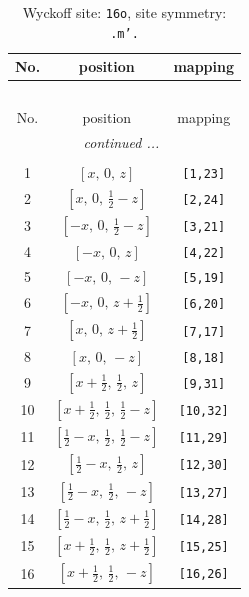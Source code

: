 \documentclass[fleqn,8pt]{jsarticle}
\begin{document}
\renewcommand{\arraystretch}{1.2}
\begin{longtable}{ccc}
\caption{Wyckoff site: {\tt 16o}, site symmetry: {\tt .m'.}}
 \\
 \hline \hline
No. & position & mapping \\ \hline \endfirsthead

\multicolumn{2}{l}{\tablename\ \thetable{}} \\
 \hline \hline
No. & position & mapping \\ \hline \endhead

 \hline \hline
\multicolumn{2}{r}{\footnotesize\it continued ...} \\ \endfoot

 \hline \hline
\multicolumn{2}{r}{} \\ \endlastfoot

1 & $\left[ x,\, 0,\, z \right]$ & {\tt [1,23]} \\ \hline
2 & $\left[ x,\, 0,\, \frac{1}{2} - z \right]$ & {\tt [2,24]} \\ \hline
3 & $\left[ - x,\, 0,\, \frac{1}{2} - z \right]$ & {\tt [3,21]} \\ \hline
4 & $\left[ - x,\, 0,\, z \right]$ & {\tt [4,22]} \\ \hline
5 & $\left[ - x,\, 0,\, - z \right]$ & {\tt [5,19]} \\ \hline
6 & $\left[ - x,\, 0,\, z + \frac{1}{2} \right]$ & {\tt [6,20]} \\ \hline
7 & $\left[ x,\, 0,\, z + \frac{1}{2} \right]$ & {\tt [7,17]} \\ \hline
8 & $\left[ x,\, 0,\, - z \right]$ & {\tt [8,18]} \\ \hline
9 & $\left[ x + \frac{1}{2},\, \frac{1}{2},\, z \right]$ & {\tt [9,31]} \\ \hline
10 & $\left[ x + \frac{1}{2},\, \frac{1}{2},\, \frac{1}{2} - z \right]$ & {\tt [10,32]} \\ \hline
11 & $\left[ \frac{1}{2} - x,\, \frac{1}{2},\, \frac{1}{2} - z \right]$ & {\tt [11,29]} \\ \hline
12 & $\left[ \frac{1}{2} - x,\, \frac{1}{2},\, z \right]$ & {\tt [12,30]} \\ \hline
13 & $\left[ \frac{1}{2} - x,\, \frac{1}{2},\, - z \right]$ & {\tt [13,27]} \\ \hline
14 & $\left[ \frac{1}{2} - x,\, \frac{1}{2},\, z + \frac{1}{2} \right]$ & {\tt [14,28]} \\ \hline
15 & $\left[ x + \frac{1}{2},\, \frac{1}{2},\, z + \frac{1}{2} \right]$ & {\tt [15,25]} \\ \hline
16 & $\left[ x + \frac{1}{2},\, \frac{1}{2},\, - z \right]$ & {\tt [16,26]} \\
\end{longtable}
\end{document}
